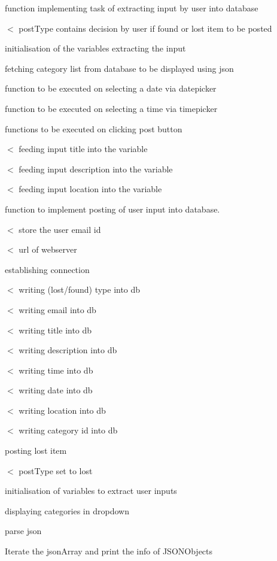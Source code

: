 function implementing task of extracting input by user into database 

$<$ post\-Type contains decision by user if found or lost item to be posted

initialisation of the variables extracting the input

fetching category list from database to be displayed using json

function to be executed on selecting a date via datepicker

function to be executed on selecting a time via timepicker

functions to be executed on clicking post button

$<$ feeding input title into the variable

$<$ feeding input description into the variable

$<$ feeding input location into the variable

function to implement posting of user input into database.

$<$ store the user email id

$<$ url of webserver

establishing connection

$<$ writing (lost/found) type into db

$<$ writing email into db

$<$ writing title into db

$<$ writing description into db

$<$ writing time into db

$<$ writing date into db

$<$ writing location into db

$<$ writing category id into db

posting lost item

$<$ post\-Type set to lost

initialisation of variables to extract user inputs

displaying categories in dropdown

parse json

Iterate the json\-Array and print the info of J\-S\-O\-N\-Objects 

